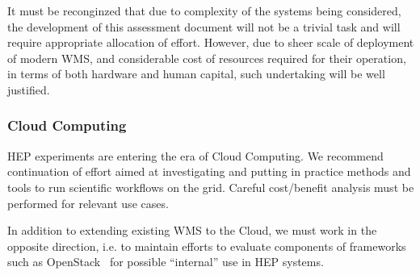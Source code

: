 It must be reconginzed that due to complexity of the systems being considered, the development of this assessment document will not be a trivial
task and will require appropriate allocation of effort. However, due to sheer scale of deployment of modern WMS, and considerable cost of resources
required for their operation, in terms of both hardware and human capital, such undertaking will be well justified.

\subsubsection*{Cloud Computing}
HEP experiments are entering the era of Cloud Computing. We recommend continuation of effort aimed at investigating and putting in practice
methods and tools to run scientific workflows on the grid. Careful cost/benefit analysis must be performed for relevant use cases.

In addition to extending existing WMS to the Cloud, we must work in the opposite direction, i.e. to maintain efforts to evaluate components of frameworks such as OpenStack~\cite{openstack} for possible ``internal'' use in HEP systems.



